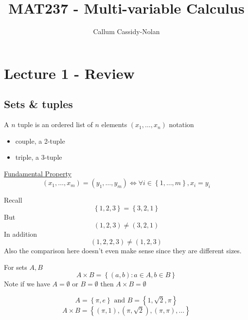 \documentclass[11pt]{book}
\title{MAT237 - Multi-variable Calculus}
\author{Callum Cassidy-Nolan}
\begin{document}


\chapter{Lecture 1 - Review}%
\label{chp:lecture_1_review}

\section{Sets \& tuples}%
\label{sec:sets_&_tuples}




\begin{defn}[Tuple]\label{defn:tuple}
    A $n$ tuple is an ordered list of $n$ elements $\left( x_1, \ldots ,  x_{n}  \right) $ 
    notation 
    \begin{itemize}
        \item couple, a 2-tuple 
        \item triple, a 3-tuple 
    \end{itemize}
    \underline{Fundamental Property } 
    \[
        \left( x_1, \ldots , x_{m}  \right) = \left( y_{1} , \ldots , y_{m}  \right) \Leftrightarrow \forall i \in \left\{ 1, \ldots , m \right\}, x_{i} = y_{i} 
    \]
\end{defn}

Recall 
\[
\left\{ 1,2,3 \right\} = \left\{ 3,2,1 \right\} 
\]
But
\[
    \left( 1,2,3 \right) \neq \left( 3,2,1 \right) 
\]
In addition 
\[
    \left( 1,2,2,3 \right) \neq \left( 1,2,3 \right) 
\]
Also the comparison here doesn't even make sense since they are different sizes.

\begin{defn}\label{defn:cartesian_product}
    For sets $A,B$ 
    \[
        A\times B= \left\{ \left( a,b \right) : a \in A, b \in B \right\} 
    \]
    Note if we have $A= \emptyset $ or $B= \emptyset $ then $A\times B= \emptyset $  
\end{defn}

\begin{eg}
    \[
    A= \left\{ \pi , e \right\} \text{ and } B= \left\{ 1, \sqrt{2} , \pi  \right\} 
    \]
    \[
        A\times B = \left\{ \left( \pi , 1 \right) , \left( \pi , \sqrt{2}  \right) , \left( \pi , \pi  \right) ,\ldots  \right\} 
    \]
\end{eg}
\end{document}
